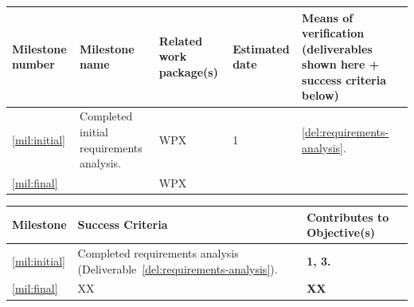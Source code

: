 \documentclass[a4paper,11pt]{article}
\begin{document}
\newpage



\label{sect:milestones}

\bigskip\bigskip\bigskip

\begin{minipage}{\textwidth}
\begin{center}
\begin{tabular*}{\textwidth}{|p{1.5cm}|p{6.7cm}|p{2.5cm}|p{1.5cm}|p{3.6cm}|}  \hline
\textbf{Milestone number} & \textbf{Milestone name} & \textbf{Related work
  package(s)} & \textbf{Estimated date} & \textbf{Means of
  verification} (deliverables shown here + success criteria below) \\
\hline
\ref{mil:initial} &
  Completed initial requirements analysis.  &
  WPX &
  1 &
\ref{del:requirements-analysis}.
\\
\ref{mil:final} &
&
WPX &
&
\\
\hline
\end{tabular*}
\end{center}
\end{minipage}

\vspace{10pt}
\begin{center}
\begin{tabular*}{\textwidth}{|p{1.5cm}|p{13.3cm}|p{1.9cm}|}\hline
\textbf{Milestone} & \textbf{Success Criteria} & \textbf{Contributes to
  Objective(s)} \\\hline
\ref{mil:initial} &
Completed requirements analysis (Deliverable~\ref{del:requirements-analysis}). &
 \textbf{1, 3.}
\\
\ref{mil:final} &
XX
& \textbf{XX}
\\\hline
\end{tabular*}
\end{center}





\end{document}
